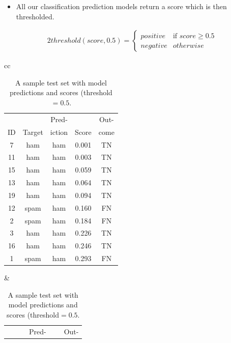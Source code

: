 \documentclass[xcolor={table}]{beamer}
\newcommand{\featN}[1]{\textsc{#1}}
\begin{document}
 \begin{frame} 
 \begin{itemize}
 	\item All our classification prediction models return a score which is then thresholded.
\end{itemize}
 \begin{example}
\begin{alignat}{2}
threshold(score, 0.5) = \begin{cases}
		positive & \text{if } score \ge 0.5\\
		negative & otherwise
	\end{cases}
\end{alignat}
\end{example}
\end{frame} 

 \begin{frame} 
\begin{table}[htb]
\caption{A sample test set with model predictions and scores (threshold$=0.5$.}
\label{tab:samplePredictionExampleExtended}
\centering
\begin{tiny}
\begin{tabular}{cc}
		\hline
			\begin{minipage}{0.45\textwidth}
						\centering
					\begin{tabular}{  c  c  c  c  c }
~	 & ~	& Pred- & ~ & Out-\\
\featN{ID}	 & Target	& iction & Score & come\\
\hline
7	&	ham	&	ham	&	0.001	&	TN	\\
11	&	ham	&	ham	&	0.003	&	TN	\\
15	&	ham	&	ham	&	0.059	&	TN	\\
13	&	ham	&	ham	&	0.064	&	TN	\\
19	&	ham	&	ham	&	0.094	&	TN	\\
12	&	spam	&	ham	&	0.160	&	FN	\\
2	&	spam	&	ham	&	0.184	&	FN	\\
3	&	ham	&	ham	&	0.226	&	TN	\\
16	&	ham	&	ham	&	0.246	&	TN	\\
1	&	spam	&	ham	&	0.293	&	FN	\\
\hline 
\end{tabular}
			\end{minipage}
			&
			\begin{minipage}{0.45\textwidth}
			\centering
										\begin{tabular}{  c  c  c  c  c }
~	 & ~	& Pred- & ~ & Out-\\

\end{tabular}
\end{minipage}
\end{tabular}
\end{tiny}
\end{table}
\end{frame}
\end{document}
